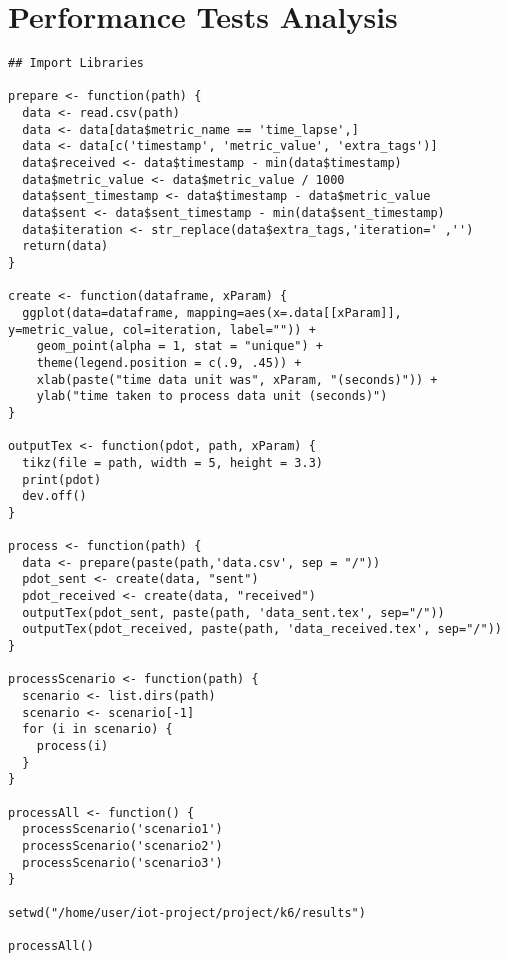 \chapter{Performance Tests Analysis}
\label{AppendixG}

\begin{lstlisting}[style=Java,basicstyle=\tiny, caption=Analysis Script, label={code:AppendixG:script}]
## Import Libraries

prepare <- function(path) {
  data <- read.csv(path)
  data <- data[data$metric_name == 'time_lapse',]
  data <- data[c('timestamp', 'metric_value', 'extra_tags')]
  data$received <- data$timestamp - min(data$timestamp)
  data$metric_value <- data$metric_value / 1000
  data$sent_timestamp <- data$timestamp - data$metric_value
  data$sent <- data$sent_timestamp - min(data$sent_timestamp)
  data$iteration <- str_replace(data$extra_tags,'iteration=' ,'')
  return(data)
}

create <- function(dataframe, xParam) {
  ggplot(data=dataframe, mapping=aes(x=.data[[xParam]], y=metric_value, col=iteration, label="")) + 
    geom_point(alpha = 1, stat = "unique") +
    theme(legend.position = c(.9, .45)) +
    xlab(paste("time data unit was", xParam, "(seconds)")) +
    ylab("time taken to process data unit (seconds)")
}

outputTex <- function(pdot, path, xParam) {
  tikz(file = path, width = 5, height = 3.3)
  print(pdot)
  dev.off()
}

process <- function(path) {
  data <- prepare(paste(path,'data.csv', sep = "/"))
  pdot_sent <- create(data, "sent")
  pdot_received <- create(data, "received")
  outputTex(pdot_sent, paste(path, 'data_sent.tex', sep="/"))
  outputTex(pdot_received, paste(path, 'data_received.tex', sep="/"))
}

processScenario <- function(path) {
  scenario <- list.dirs(path)
  scenario <- scenario[-1]
  for (i in scenario) {
    process(i)
  }
}

processAll <- function() {
  processScenario('scenario1')
  processScenario('scenario2')
  processScenario('scenario3')
}

setwd("/home/user/iot-project/project/k6/results")

processAll()
\end{lstlisting}
